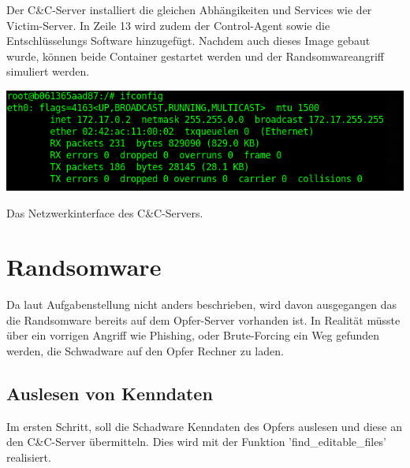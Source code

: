 \documentclass[12pt]{article}
\begin{document}
Der C\&C-Server installiert die gleichen Abhängikeiten und Services wie der Victim-Server. In Zeile 13 wird zudem der Control-Agent sowie die Entschlüsselungs Software hinzugefügt. Nachdem auch dieses Image gebaut wurde, können beide Container gestartet werden und der Randsomwareangriff simuliert werden.
\begin{center}
 \includegraphics[scale=0.3]{CIp.png}
\end{center}
Das Netzwerkinterface des C\&C-Servers.
\newpage
\section{Randsomware}

Da laut Aufgabenstellung nicht anders beschrieben, wird davon ausgegangen das die Randsomware bereits auf dem Opfer-Server vorhanden ist. In Realität müsste über ein vorrigen Angriff wie Phishing, oder Brute-Forcing ein Weg gefunden werden, die Schwadware auf den Opfer Rechner zu laden.
\subsection{Auslesen von Kenndaten}
Im ersten Schritt, soll die Schadware Kenndaten des Opfers auslesen und diese an den C\&C-Server übermitteln. Dies wird mit der Funktion 'find\_editable\_files' realisiert.
\end{document}
